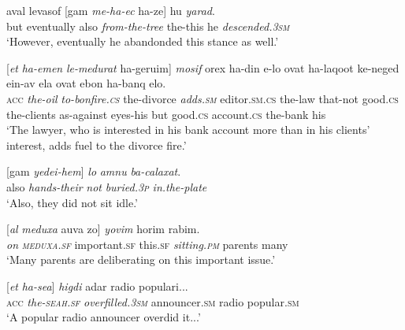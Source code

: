 \documentclass[output=paper]{langsci/langscibook}
\begin{document}
	\ea\label{she:ec-top}
		\gll {\alef}aval levasof \textnormal{[}gam \textit{me-ha-{\ayin}ec} ha-ze\textnormal{]} hu \textit{yarad}.\\
		  but eventually also \textit{from-the-tree} the-this he \textit{descended.\textsc{3sm}}\\
		\glt `However, eventually he abandonded this stance as well.'
	\z
	
    \ea\label{she:medura-top}
        \gll \textnormal{[}\textit{{\alef}et} \textit{ha-{\shin}emen} \textit{le-medurat} ha-geru{\shin}im\textnormal{]} \textit{mosif} {\ayin}orex ha-din {\shin}e-lo {\tet}ovat ha-laqo{\het}ot ke-neged {\ayin}ein-av {\alef}ela {\tet}ovat {\het}e{\shin}bon ha-banq {\shin}elo.\\
            \textsc{acc} \textit{the-oil} \textit{to-bonfire.\textsc{cs}} the-divorce \textit{adds.\textsc{sm}} editor.\textsc{sm}.\textsc{cs} the-law that-not good.\textsc{cs} the-clients as-against eyes-his but good.\textsc{cs} account.\textsc{cs} the-bank his\\
        \glt `The lawyer, who is interested in his bank account more than in his clients' interest, adds fuel to the divorce fire.'
    \z

	
	\ea\label{she:taman-top}
		\gll \textnormal{[}gam \textit{yedei-hem}\textnormal{]} \textit{lo} \textit{{\tet}amnu} \textit{ba-calaxat}.\\
		also \textit{hands-their} \textit{not} \textit{buried.\textsc{3p}} \textit{in.the-plate}\\
		\glt `Also, they did not sit idle.'
	\z
	
    \ea\label{she:meduxa-top}
        \gll \textnormal{[}\textit{{\ayin}al} \textit{meduxa} {\het}a{\shin}uva zo\textnormal{]} \textit{yo{\shin}vim} horim rabim.\\
                  \textit{on} \textit{\textsc{meduxa}.\textsc{sf}} important.\textsc{sf} this.\textsc{sf} \textit{sitting.\textsc{pm}} parents many\\
        \glt `Many parents are deliberating on this important issue.'
    \z

	\ea\label{she:sea-top}
    	\gll \textnormal{[}\textit{{\alef}et} \textit{ha-se{\alef}a}\textnormal{]} \textit{higdi{\shin}} {\shin}adar radio populari...\\
    	   \textsc{acc} \textit{the-\textsc{seah}.\textsc{sf}} \textit{overfilled.\textsc{3sm}} announcer.\textsc{sm} radio popular.\textsc{sm}\\
    	\glt `A popular radio announcer overdid it...'
	\z
\end{document}
